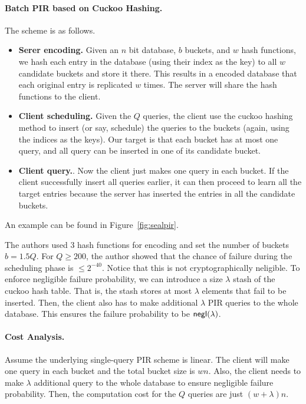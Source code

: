 \paragraph{Batch PIR based on Cuckoo Hashing.}   
The scheme is as follows.
\begin{itemize}
    \item \textbf{Serer encoding.} Given an $n$ bit database, $b$ buckets, and $w$ hash functions, we hash each entry in the database (using their index as the key) to all $w$ candidate buckets and store it there.
    This results in a encoded database that each original entry is replicated $w$ times.
    The server will share the hash functions to the client.
    
    \item \textbf{Client scheduling.} Given the $Q$ queries, the client use the cuckoo hashing method to insert (or say, schedule) the queries to the buckets (again, using the indices as the keys).
    Our target is that each bucket has at most one query, and all query can be inserted in one of its candidate bucket.
    
    \item \textbf{Client query.}. Now the client just makes one query in each bucket. If the client successfully insert all queries earlier, it can then proceed to learn all the target entries because the server has inserted the entries in all the candidate buckets.
\end{itemize}

An example can be found in Figure~\ref{fig:sealpir}.
   
The authors used 3 hash functions for encoding and set the number of buckets $b = 1.5Q$. For $Q\geq 200$, the author showed that the chance of failure during
the scheduling phase is $\leq 2^{-40}$.
Notice that this is not cryptographically neligible. 
To enforce negligible failure probability, we can introduce a size $\lambda$ stash of the cuckoo hash table.
That is, the stash stores at most $\lambda$ elements that fail to be inserted. 
Then, the client also has to make additional $\lambda$ PIR queries to the whole database.
This ensures the failure probability to be ${\sf negl}(\lambda)$.

\paragraph{Cost Analysis.} 
Assume the underlying single-query PIR scheme is linear.
The client will make one query in each bucket and the total bucket size is $wn$.
Also, the client needs to make $\lambda$ additional query to the whole database to ensure negligible failure probability.
Then, the computation cost for the $Q$ queries are just $(w+\lambda)n$.


